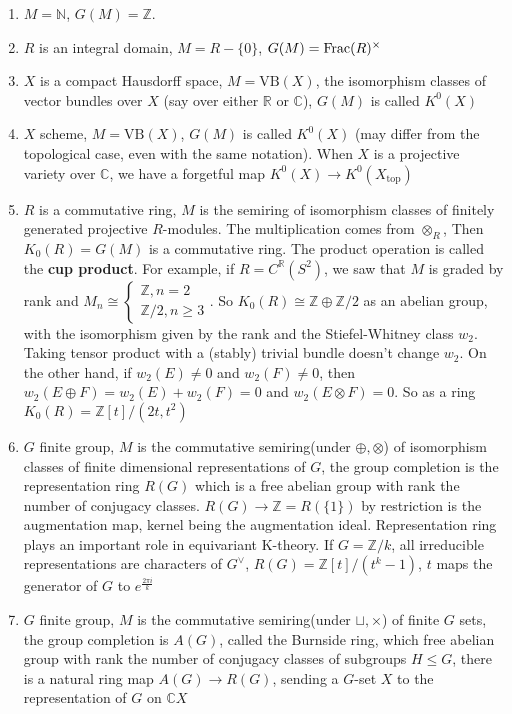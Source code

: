 \documentclass[main]{subfiles}
\begin{document}
\begin{example}
\begin{enumerate}
\item $M=\mathbb N$, $G(M)=\mathbb Z$.
\item $R$ is an integral domain, $M=R-\{0\}$, $G(M)=\operatorname{Frac}(R)^\times$
\item $X$ is a compact Hausdorff space, $M=\mathrm{VB}(X)$, the isomorphism classes of vector bundles over $X$ (say over either $\mathbb R$ or $\mathbb C$), $G(M)$ is called $K^0(X)$
\item $X$ scheme, $M=\mathrm{VB}(X)$, $G(M)$ is called $K^0(X)$ (may differ from the topological case, even with the same notation). When $X$ is a projective variety over $\mathbb C$, we have a forgetful map $K^0(X)\to K^0(X_{\text{top}})$
\item $R$ is a commutative ring, $M$ is the semiring of isomorphism classes of finitely generated projective $R$-modules. The multiplication comes from $\otimes_R$, Then $K_0(R)=G(M)$ is a commutative ring. The product operation is called the \textbf{cup product}. For example, if $R=C^{\mathbb R}(S^2)$, we saw that $M$ is graded by rank and $M_n\cong\begin{cases}
\mathbb Z,n=2\\
\mathbb Z/2,n\geq3
\end{cases}$. So $K_0(R)\cong\mathbb Z\oplus\mathbb Z/2$ as an abelian group, with the isomorphism given by the rank and the Stiefel-Whitney class $w_2$. Taking tensor product with a (stably) trivial bundle doesn't change $w_2$. On the other hand, if $w_2(E)\neq0$ and $w_2(F)\neq0$, then $w_2(E\oplus F)=w_2(E)+w_2(F)=0$ and $w_2(E\otimes F)=0$. So as a ring $K_0(R)=\mathbb Z[t]/(2t,t^2)$
\item $G$ finite group, $M$ is the commutative semiring(under $\oplus,\otimes$) of isomorphism classes of finite dimensional representations of $G$, the group completion is the representation ring $R(G)$ which is a free abelian group with rank the number of conjugacy classes. $R(G)\to\mathbb Z=R(\{1\})$ by restriction is the augmentation map, kernel being the augmentation ideal. Representation ring plays an important role in equivariant K-theory. If $G=\mathbb Z/k$, all irreducible representations are characters of $G^\vee$, $R(G)=\mathbb Z[t]/(t^k-1)$, $t$ maps the generator of $G$ to $e^{\frac{2\pi i}{k}}$
\item $G$ finite group, $M$ is the commutative semiring(under $\sqcup,\times$) of finite $G$ sets, the group completion is $A(G)$, called the Burnside ring, which free abelian group with rank the number of conjugacy classes of subgroups $H\leq G$, there is a natural ring map $A(G)\to R(G)$, sending a $G$-set $X$ to the representation of $G$ on $\mathbb CX$
\end{enumerate}
\end{example}
\end{document}
